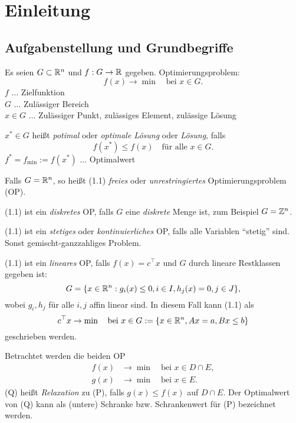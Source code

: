 \chapter{Einleitung}
\section{Aufgabenstellung und Grundbegriffe}
Es seien $G \subset \mathbb{R}^n$ und $f: G \to \mathbb{R}$ gegeben. Optimierungsproblem:
\begin{equation}
  f(x) \to \min \quad \text{bei } x \in G.
\end{equation}
$f$ ... Zielfunktion \\
$G$ ... Zulässiger Bereich \\
$x \in G$ ... Zulässiger Punkt, zulässiges Element, zulässige Lösung

$x^* \in G$  heißt \emph{potimal} oder \emph{optimale Lösung} oder
\emph{Lösung}, falls
\begin{equation}
  f(x^*) \le f(x) \quad \text{für alle } x \in G.
\end{equation}
$f^* = f_{\min} := f(x^*)$ ... Optimalwert

Falls $G = \mathbb{R}^n$, so heißt (1.1) \emph{freies} oder \emph{unrestringiertes}
Optimierungsproblem (OP).

(1.1) ist ein \emph{diskretes} OP, falls $G$ eine
\emph{diskrete} Menge ist, zum Beispiel $G = \mathbb{Z}^n$.

(1.1) ist ein \emph{stetiges} oder \emph{kontinuierliches} OP, falls alle
Variablen ``stetig'' sind. Sonst gemischt-ganzzahliges Problem.

(1.1) ist ein \emph{lineares} OP, falls $f(x) = c^\top x$ und $G$ durch lineare
Restklassen gegeben ist:
\begin{equation}
  G = \{ x \in \mathbb{R}^n : g_i(x) \le 0, i \in I, h_j(x) = 0, j \in J \},
\end{equation}
wobei $g_i, h_j$ für alle $i,j$ affin linear sind. In diesem Fall kann (1.1) als
\[ c^\top x \to \min \quad \text{bei } x \in G:= \{ x \in \mathbb{R}^n, Ax = a, Bx \le b
  \} \]
geschrieben werden.

\begin{defn}
  Betrachtet werden die beiden OP
  \begin{align*}
    f(x) &\to \min \quad \text{bei } x \in D \cap E, \tag{P} \\
    g(x) &\to \min \quad \text{bei } x \in E. \tag{Q}
  \end{align*}
  (Q) heißt \emph{Relaxation} zu (P), falls $g(x) \le f(x)$ auf $D \cap E$. Der
  Optimalwert von (Q) kann als (untere) Schranke bzw. Schrankenwert für (P)
  bezeichnet werden.
\end{defn}

